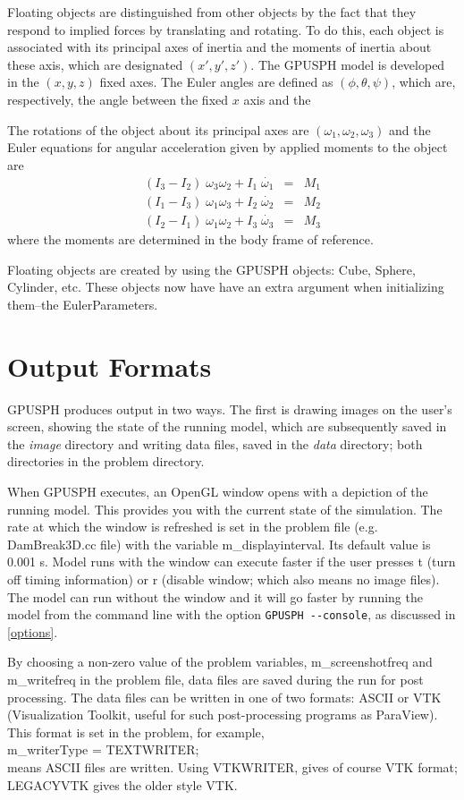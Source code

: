 \documentclass[12pt]{memoir}
\begin{document}
{{{{Floating objects are distinguished from other objects by the fact that
they respond to implied forces by translating and rotating. To do this,
each object is associated with its principal axes of inertia and the
moments of inertia about these axis, which are designated $(x',y',z')$.
The GPUSPH model is developed in the $(x,y,z)$ fixed axes. The Euler
angles are defined as $(\phi, \theta, \psi)$, which are, respectively,
the angle between the fixed $x$ axis and the

The rotations of the object about its principal axes are $(\omega_1,
\omega_2, \omega_3)$ and the Euler equations for angular acceleration
given by applied moments to the object are 
\begin{eqnarray} 
(I_3 - I_2)
\;\omega_3\omega_2 + I_1 \; \dot{{\omega_1}} &=& M_1 \\ (I_1-I_3)
\;\omega_1 \omega_3 + I_2 \;\dot{{\omega_2}} &=& M_2\\ (I_2-I_1)
\;\omega_1 \omega_2 + I_3 \;\dot{{\omega_3}} &=& M_3 
\end{eqnarray}
where the moments are determined in the body frame of reference.


Floating objects are created by using the GPUSPH objects: Cube, Sphere,
Cylinder, etc. These objects now have have an extra argument when
initializing them--the EulerParameters. \section{Output Formats}

GPUSPH produces output in two ways. The first is drawing images on the
user's screen, showing the state of the running model, which are
subsequently saved in the {\em image} directory and writing data files,
saved in the {\em data} directory; both directories in the problem
directory.


When GPUSPH executes, an OpenGL window opens with a depiction of the
running model. This provides you with the current state of the
simulation. The rate at which the window is refreshed is set in the
problem file (e.g. DamBreak3D.cc file) with the variable
m\_displayinterval. Its default value is 0.001 s. Model runs with the
window can execute faster if the user presses t (turn off timing
information) or r (disable window; which also means no image files).
The model can run without the window and it will go faster by running
the model from the command line with the option \verb!GPUSPH --console!,
as discussed in \ref{options}.

By choosing a non-zero value of the problem variables, m\_screenshotfreq
and m\_writefreq in the problem file, data files are saved during the
run for post processing. The data files can be written in one of two
formats: ASCII or VTK (Visualization Toolkit, useful for such
post-processing programs as ParaView). This format is set in the
problem, for example, \\ m\_writerType = TEXTWRITER;\\ means ASCII files
are written. Using VTKWRITER, gives of course VTK format; LEGACYVTK
gives the older style VTK.



}}}}
\end{document}
